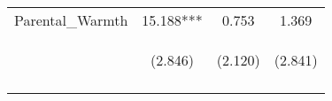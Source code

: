 \begin{tabular}{lccc}
\noalign{\smallskip}Parental\_Warmth & 15.188*** & 0.753 & 1.369\\
 & \begin{footnotesize}(2.846)\end{footnotesize} & \begin{footnotesize}(2.120)\end{footnotesize} & \begin{footnotesize}(2.841)\end{footnotesize}\\
\noalign{\smallskip}\hline\end{tabular}\\
